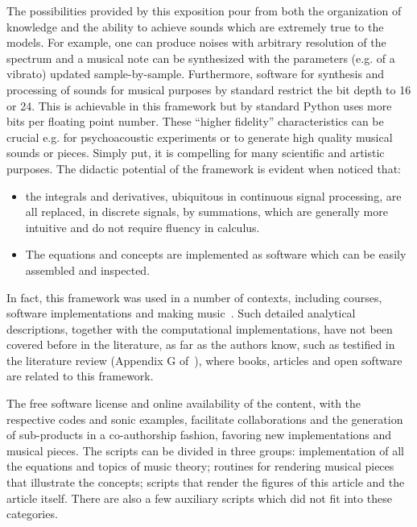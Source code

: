 The possibilities provided by this exposition pour from both the organization of knowledge and the ability to achieve sounds which are extremely true to the models.
For example, one can produce noises with arbitrary resolution of the spectrum and a musical note can be synthesized with the parameters (e.g. of a vibrato) updated sample-by-sample.
Furthermore, software for synthesis and processing of sounds for musical purposes
by standard restrict the bit depth to 16 or 24.
This is achievable in this framework but by standard Python uses more bits per floating point number.
These ``higher fidelity'' characteristics can be crucial
e.g. for psychoacoustic experiments or to generate high quality musical sounds or pieces.
Simply put, it is compelling
for many scientific and artistic purposes.
The didactic potential of the framework is evident when noticed that:
\begin{itemize}
	\item the integrals and derivatives, ubiquitous in continuous signal processing,
are all replaced, in discrete signals, by summations,
which are generally more intuitive and do not require fluency in calculus.
	\item The equations and concepts are implemented as software which can be easily assembled and inspected.
\end{itemize}
\noindent In fact, this framework was used in a number of contexts, including courses, software implementations and making music~\cite{vimeoLM,vivace,repoDissertacao,dissertacao}.
Such detailed analytical descriptions, together with the computational implementations, have not been covered before in the literature, as far as the authors know, such as testified in the literature review (Appendix G of~\cite{dissertacao}), where books, articles and open software are related to this framework.

The free software license and online availability of the content,
with the respective codes and sonic examples, facilitate collaborations and the generation of sub-products in a co-authorship fashion,
favoring new implementations and musical pieces.
The scripts can be divided in three groups: implementation of all the equations and topics of music theory; routines for rendering musical pieces that illustrate the concepts; scripts that render the figures of this article and the article itself.
There are also a few auxiliary scripts which did not fit into these categories.~\cite{SI}

